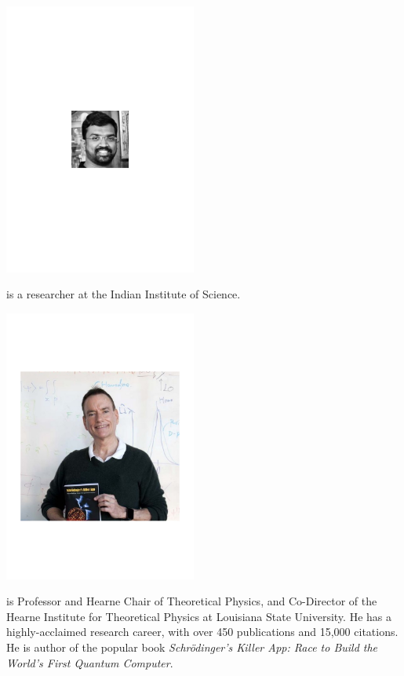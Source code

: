 
%
%

\begin{center}
\includegraphics[clip=true, width=0.475\textwidth]{photo_rohit_ramakrishnan}
\end{center}

 is a researcher at the Indian Institute of Science.


%
%

\begin{center}
\includegraphics[clip=true, width=0.475\textwidth]{photo_jon_dowling}
\end{center}

 is Professor and Hearne Chair of Theoretical Physics, and Co-Director of the Hearne Institute for Theoretical Physics at Louisiana State University. He has a highly-acclaimed research career, with over 450 publications and 15,000 citations. He is author of the popular book \textit{Schr\"odinger's Killer App: Race to Build the World's First Quantum Computer}.

